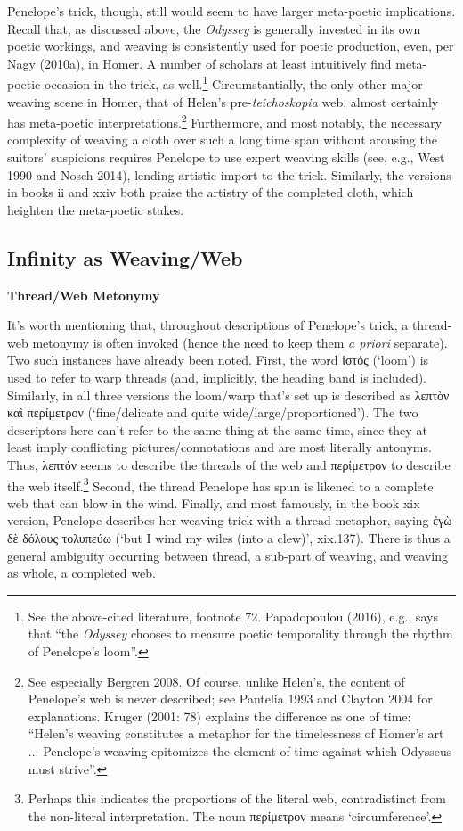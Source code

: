 \documentclass[12pt]{article}
\begin{document}
Penelope's trick, though, still would seem to have larger meta-poetic implications. Recall that, as discussed above, the \textit{Odyssey} is generally invested in its own poetic workings, and weaving is consistently used for poetic production, even, per Nagy (2010a), in Homer. A number of scholars at least intuitively find meta-poetic occasion in the trick, as well.\footnote{ See the above-cited literature, footnote 72. Papadopoulou (2016), e.g., says that ``the \textit{Odyssey} chooses to measure poetic temporality through the rhythm of Penelope's loom''.} Circumstantially, the only other major weaving scene in Homer, that of Helen's pre-\textit{teichoskopia} web, almost certainly has meta-poetic interpretations.\footnote{ See especially Bergren 2008. Of course, unlike Helen's, the content of Penelope's web is never described; see Pantelia 1993 and Clayton 2004 for explanations. Kruger (2001: 78) explains the difference as one of time: ``Helen's weaving constitutes a metaphor for the timelessness of Homer's art ... Penelope's weaving epitomizes the element of time against which Odysseus must strive''.} Furthermore, and most notably, the necessary complexity of weaving a cloth over such a long time span without arousing the suitors' suspicions requires Penelope to use expert weaving skills (see, e.g., West 1990 and Nosch 2014), lending artistic import to the trick. Similarly, the versions in books ii and xxiv both praise the artistry of the completed cloth, which heighten the meta-poetic stakes.

\subsection{ Infinity as Weaving/Web}

\noindent \textbf{Thread/Web Metonymy}

It's worth mentioning that, throughout descriptions of Penelope's trick, a thread-web metonymy is often invoked (hence the need to keep them \textit{a priori} separate). Two such instances have already been noted. First, the word ἱστός (`loom') is used to refer to warp threads (and, implicitly, the heading band is included). Similarly, in all three versions the loom/warp that's set up is described as λεπτὸν καὶ περίμετρον (`fine/delicate and quite wide/large/proportioned'). The two descriptors here can't refer to the same thing at the same time, since they at least imply conflicting pictures/connotations and are most literally antonyms. Thus, λεπτόν seems to describe the threads of the web and περίμετρον to describe the web itself.\footnote{ Perhaps this indicates the proportions of the literal web, contradistinct from the non-literal interpretation. The noun περίμετρον means `circumference'.} Second, the thread Penelope has spun is likened to a complete web that can blow in the wind. Finally, and most famously, in the book xix version, Penelope describes her weaving trick with a thread metaphor, saying ἐγὼ δὲ δόλους τολυπεύω (`but I wind my wiles (into a clew)', xix.137). There is thus a general ambiguity occurring between thread, a sub-part of weaving, and weaving as whole, a completed web.
\end{document}
